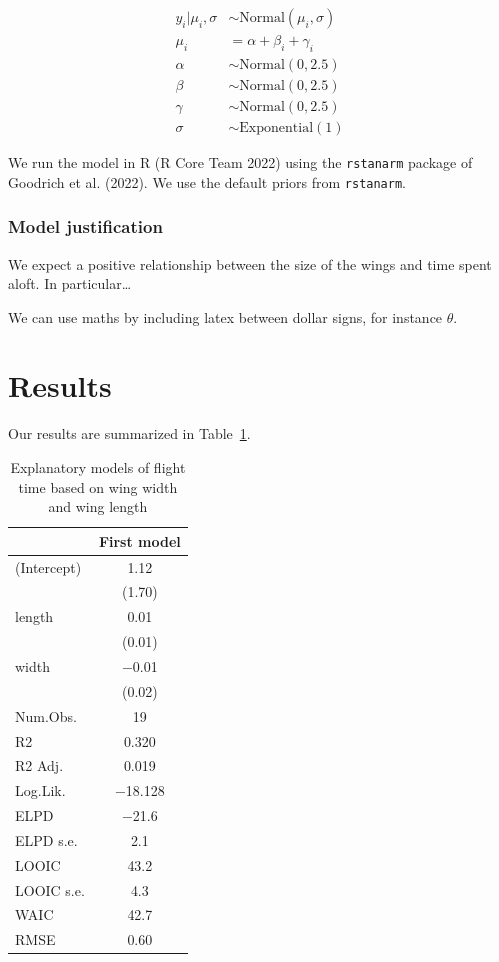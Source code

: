 \documentclass[
  letterpaper,
  DIV=11,
  numbers=noendperiod]{scrartcl}
\begin{document}
\begin{align} 
y_i|\mu_i, \sigma &\sim \mbox{Normal}(\mu_i, \sigma) \\
\mu_i &= \alpha + \beta_i + \gamma_i\\
\alpha &\sim \mbox{Normal}(0, 2.5) \\
\beta &\sim \mbox{Normal}(0, 2.5) \\
\gamma &\sim \mbox{Normal}(0, 2.5) \\
\sigma &\sim \mbox{Exponential}(1)
\end{align}

We run the model in R (R Core Team 2022) using the \texttt{rstanarm}
package of Goodrich et al. (2022). We use the default priors from
\texttt{rstanarm}.

\hypertarget{model-justification}{%
\subsubsection{Model justification}\label{model-justification}}

We expect a positive relationship between the size of the wings and time
spent aloft. In particular\ldots{}

We can use maths by including latex between dollar signs, for instance
\(\theta\).

\hypertarget{results}{%
\section{Results}\label{results}}

Our results are summarized in Table~\ref{tbl-modelresults}.

\hypertarget{tbl-modelresults}{}
\begin{table}
\caption{\label{tbl-modelresults}Explanatory models of flight time based on wing width and wing length }\tabularnewline

\centering
\begin{tabular}[t]{lc}
\toprule
  & First model\\
\midrule
(Intercept) & \num{1.12}\\
 & (\num{1.70})\\
length & \num{0.01}\\
 & (\num{0.01})\\
width & \num{-0.01}\\
 & (\num{0.02})\\
\midrule
Num.Obs. & \num{19}\\
R2 & \num{0.320}\\
R2 Adj. & \num{0.019}\\
Log.Lik. & \num{-18.128}\\
ELPD & \num{-21.6}\\
ELPD s.e. & \num{2.1}\\
LOOIC & \num{43.2}\\
LOOIC s.e. & \num{4.3}\\
WAIC & \num{42.7}\\
RMSE & \num{0.60}\\
\bottomrule
\end{tabular}
\end{table}
\end{document}
